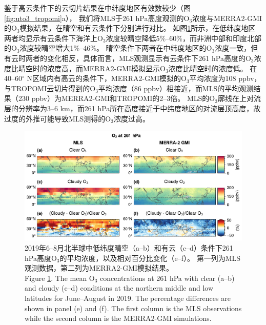 鉴于高云条件下的云切片结果在中纬度地区有效数较少（图\ref{fig:uto3_tropomi}a），
我们将MLS于261 hPa高度观测的O$_3$浓度与MERRA2-GMI的O$_3$模拟结果，在晴空和有云条件下分别进行对比。
如图\ref{fig:mls_o3_261hpa}所示，在低纬度地区两者均显示有云条件下海洋上O$_3$浓度较晴空降低5\%--60\%，而非洲中部和印度北部的O$_3$浓度较晴空增大1\%--46\%。
晴空条件下两者在中纬度地区的O$_3$浓度一致，但有云时两者的变化相反，具体而言，MLS观测显示有云条件下261 hPa高度的O$_3$浓度比晴空时的浓度高，而MERRA2-GMI模拟显示O$_3$浓度比晴空时的浓度低。
在40--60$^{\circ}$ N区域内有高云的条件下，MERRA2-GMI模拟的O$_3$平均浓度为108 ppbv，与TROPOMI云切片得到的O$_3$平均浓度（86 ppbv）相接近，而MLS的平均观测结果（230 ppbv）为MERRA2-GMI和TROPOMI的2--3倍。
MLS的O$_3$廓线在上对流层的分辨率为3--6 km，而261 hPa所在高度接近于中纬度地区的对流层顶高度，故过度的外推可能导致MLS测得的O$_3$浓度过高\citep{Schoeberl.2007}。


\begin{figure}[!htbp]
    \centering
    \includegraphics[width=15cm]{./figures/mls_o3_261hpa.pdf}
    \caption{
    2019年6--8月北半球中低纬度晴空（a--b）和有云（c--d）条件下261 hPa高度O$_3$的平均浓度，以及相对百分比变化（e--f）。
    第一列为MLS观测数据，第二列为MERRA2-GMI模拟结果。 \\
    Figure \ref{fig:mls_o3_261hpa}. The mean O$_3$ concentrations at 261 hPa with clear (a--b) and cloudy (c--d) conditions at the northern middle and low latitudes for June--August in 2019. The percentage differences are shown in panel (e) and (f).
    The first column is the MLS observations while the second column is the MERRA2-GMI simulations.
    }
    \label{fig:mls_o3_261hpa}
\end{figure}


